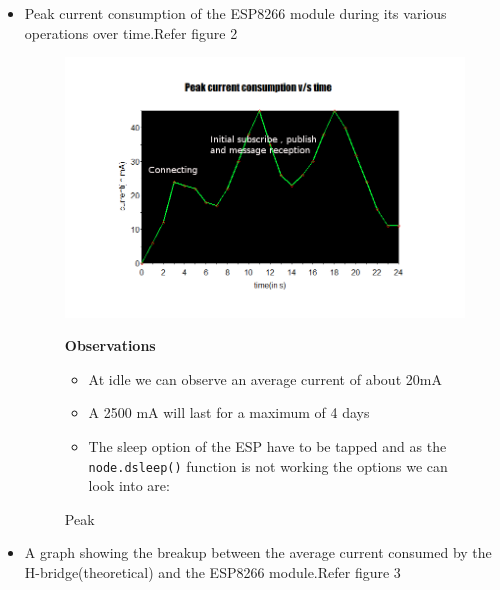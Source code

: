 \documentclass[16pt]{article}
\begin{document}
\begin{itemize}
\item
  Peak current consumption of the ESP8266 module during its various
  operations over time.Refer figure 2 

\begin{figure}
\includegraphics[width=1.2\textwidth]{images/peak_current1.png}
\caption{Peak}
\textbf{Observations}

\begin{itemize}

\item
  At idle we can observe an average current of about 20mA
\item
  A 2500 mA will last for a maximum of 4 days
\item
  The sleep option of the ESP have to be tapped and as the \\
 \texttt{node.dsleep()} function is not working the options we can look
  into are:
\end{itemize}
\end{figure}

  
\item
  A graph showing the breakup between the average current consumed by
  the H-bridge(theoretical) and the ESP8266 module.Refer figure 3
\end{itemize}
\end{document}
